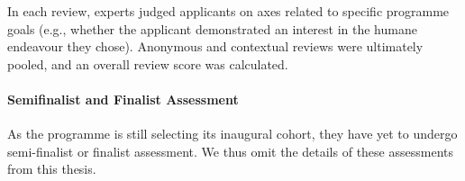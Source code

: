 In each review, experts judged applicants on axes related to specific programme goals (e.g., whether the applicant demonstrated an interest in the humane endeavour they chose). Anonymous and contextual reviews were ultimately pooled, and an overall review score was calculated.

\paragraph{Semifinalist and Finalist Assessment}
As the programme is still selecting its inaugural cohort, they have yet to undergo semi-finalist or finalist assessment. We thus omit the details of these assessments from this thesis.